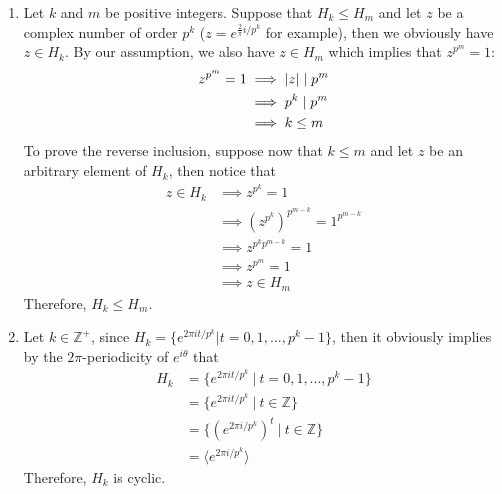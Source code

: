 \begin{solution}
    \begin{enumerate}[label = \textbf{(\alph*)}]
        \item Let $k$ and $m$ be positive integers. Suppose that $H_k \leq H_m$ and let $z$ be a complex number of order $p^k$ ($z = e^{\frac2\pi i/p^k}$ for example), then we obviously have $z \in H_k$. By our assumption, we also have $z \in H_m$ which implies that $z^{p^m} = 1$:
        \begin{align*}
            z^{p^m} = 1 &\implies |z| \mathrel{|} p^m \\
            &\implies p^k \mathrel{|} p^m \\
            &\implies k \leq m
        \end{align*}
        To prove the reverse inclusion, suppose now that $k \leq m$ and let $z$ be an arbitrary element of $H_k$, then notice that
        \begin{align*}
            z \in H_k &\implies z^{p^k} = 1 \\
            &\implies (z^{p^k})^{p^{m-k}} = 1^{p^{m-k}} \\
            &\implies z^{p^kp^{m-k}} = 1 \\
            &\implies z^{p^{m}} = 1 \\
            &\implies z \in H_m
        \end{align*}
        Therefore, $H_k \leq H_m$.

        \item Let $k \in \mathbb{Z}^+$, since $H_k = \{e^{2\pi it/p^k} | t = 0,1,\dots , p^k-1\}$, then it obviously implies by the $2\pi$-periodicity of $e^{i\theta}$ that
        \begin{align*}
            H_k &= \{e^{2\pi it/p^k} \ | \ t = 0,1,\dots , p^k-1\} \\
            &= \{e^{2\pi it/p^k} \ | \ t \in \mathbb{Z}\} \\
            &= \{(e^{2\pi i/p^k})^t \ | \ t \in \mathbb{Z}\} \\
            &= \langle e^{2\pi i/p^k} \rangle
        \end{align*}
        Therefore, $H_k$ is cyclic.


\end{enumerate}
\end{solution}
